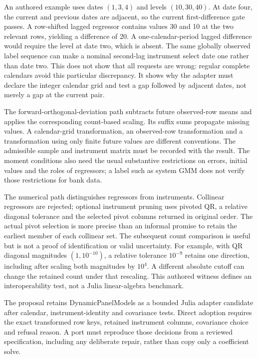 An authored example uses dates $(1,3,4)$ and levels $(10,30,40)$. At date four, the current and previous dates are adjacent, so the current first-difference gate passes. A row-shifted lagged regressor contains values 30 and 10 at the two relevant rows, yielding a difference of 20. A one-calendar-period lagged difference would require the level at date two, which is absent. The same globally observed label sequence can make a nominal second-lag instrument select date one rather than date two. This does not show that all requests are wrong: regular complete calendars avoid this particular discrepancy. It shows why the adapter must declare the integer calendar grid and test a gap followed by adjacent dates, not merely a gap at the current pair.~\citep{exec25_odyn_dpm,exec25_odyn_choice}

The forward-orthogonal-deviation path subtracts future observed-row means and applies the corresponding count-based scaling. Its suffix sums propagate missing values. A calendar-grid transformation, an observed-row transformation and a transformation using only finite future values are different conventions. The admissible sample and instrument matrix must be recorded with the result. The moment conditions also need the usual substantive restrictions on errors, initial values and the roles of regressors; a label such as system GMM does not verify those restrictions for bank data.

The numerical path distinguishes regressors from instruments. Collinear regressors are rejected; optional instrument pruning uses pivoted QR, a relative diagonal tolerance and the selected pivot columns returned in original order. The actual pivot selection is more precise than an informal promise to retain the earliest member of each collinear set. The subsequent count comparison is useful but is not a proof of identification or valid uncertainty. For example, with QR diagonal magnitudes $(1,10^{-10})$, a relative tolerance $10^{-9}$ retains one direction, including after scaling both magnitudes by $10^4$. A different absolute cutoff can change the retained count under that rescaling. This authored witness defines an interoperability test, not a Julia linear-algebra benchmark.~\citep{exec25_odyn_dpm,exec25_odyn_choice}

The proposal retains DynamicPanelModels as a bounded Julia adapter candidate after calendar, instrument-identity and covariance tests. Direct adoption requires the exact transformed row keys, retained instrument columns, covariance choice and refusal reason. A port must reproduce those decisions from a reviewed specification, including any deliberate repair, rather than copy only a coefficient solve.

